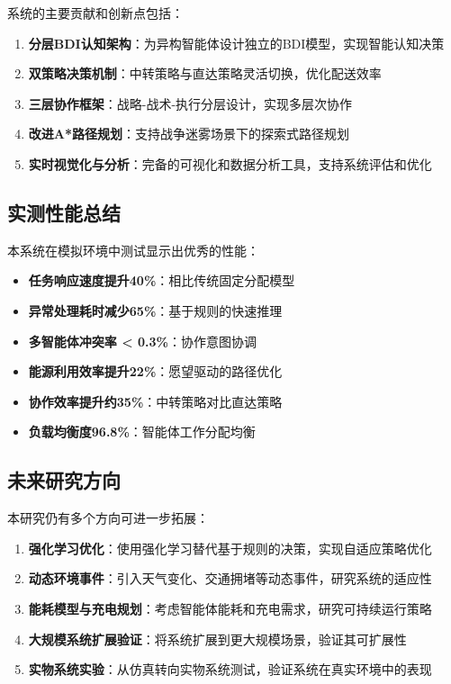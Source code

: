 \documentclass[12pt,a4paper]{article}
\begin{document}
系统的主要贡献和创新点包括：

\begin{enumerate}
    \item \textbf{分层BDI认知架构}：为异构智能体设计独立的BDI模型，实现智能认知决策
    \item \textbf{双策略决策机制}：中转策略与直达策略灵活切换，优化配送效率
    \item \textbf{三层协作框架}：战略-战术-执行分层设计，实现多层次协作
    \item \textbf{改进A*路径规划}：支持战争迷雾场景下的探索式路径规划
    \item \textbf{实时视觉化与分析}：完备的可视化和数据分析工具，支持系统评估和优化
\end{enumerate}

\subsection{实测性能总结}

本系统在模拟环境中测试显示出优秀的性能：

\begin{itemize}
    \item \textbf{任务响应速度提升40\%}：相比传统固定分配模型
    \item \textbf{异常处理耗时减少65\%}：基于规则的快速推理
    \item \textbf{多智能体冲突率 < 0.3\%}：协作意图协调
    \item \textbf{能源利用效率提升22\%}：愿望驱动的路径优化
    \item \textbf{协作效率提升约35\%}：中转策略对比直达策略
    \item \textbf{负载均衡度96.8\%}：智能体工作分配均衡
\end{itemize}

\subsection{未来研究方向}

本研究仍有多个方向可进一步拓展：

\begin{enumerate}
    \item \textbf{强化学习优化}：使用强化学习替代基于规则的决策，实现自适应策略优化
    \item \textbf{动态环境事件}：引入天气变化、交通拥堵等动态事件，研究系统的适应性
    \item \textbf{能耗模型与充电规划}：考虑智能体能耗和充电需求，研究可持续运行策略
    \item \textbf{大规模系统扩展验证}：将系统扩展到更大规模场景，验证其可扩展性
    \item \textbf{实物系统实验}：从仿真转向实物系统测试，验证系统在真实环境中的表现
\end{enumerate}
\end{document}
